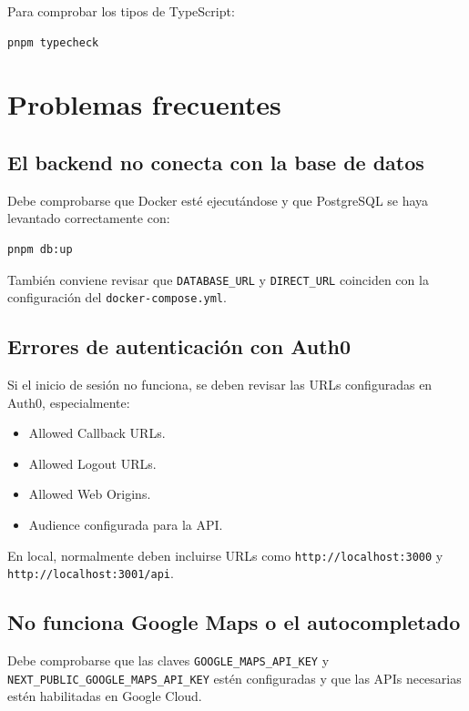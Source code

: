 Para comprobar los tipos de TypeScript:

\begin{lstlisting}[language=bash, caption={Comprobación de tipos}, label={lst:manual_instalacion_typecheck}]
pnpm typecheck
\end{lstlisting}

\section{Problemas frecuentes}

\subsection{El backend no conecta con la base de datos}

Debe comprobarse que Docker esté ejecutándose y que PostgreSQL se haya levantado correctamente con:

\begin{lstlisting}[language=bash]
pnpm db:up
\end{lstlisting}

También conviene revisar que \texttt{DATABASE\_URL} y \texttt{DIRECT\_URL} coinciden con la configuración del \texttt{docker-compose.yml}.

\subsection{Errores de autenticación con Auth0}

Si el inicio de sesión no funciona, se deben revisar las URLs configuradas en Auth0, especialmente:

\begin{itemize}
    \item Allowed Callback URLs.
    \item Allowed Logout URLs.
    \item Allowed Web Origins.
    \item Audience configurada para la API.
\end{itemize}

En local, normalmente deben incluirse URLs como \texttt{http://localhost:3000} y \texttt{http://localhost:3001/api}.

\subsection{No funciona Google Maps o el autocompletado}

Debe comprobarse que las claves \texttt{GOOGLE\_MAPS\_API\_KEY} y \texttt{NEXT\_PUBLIC\_GOOGLE\_MAPS\_API\_KEY} estén configuradas y que las APIs necesarias estén habilitadas en Google Cloud.

